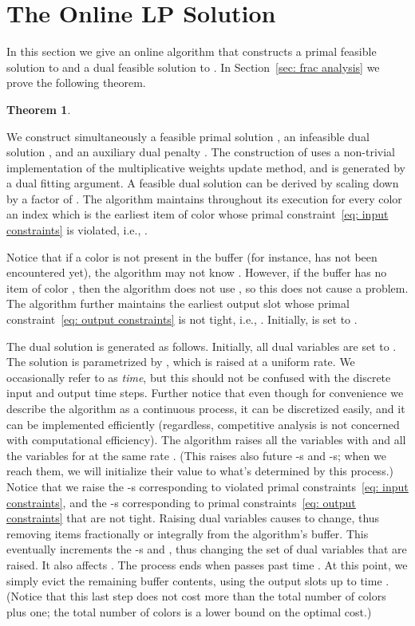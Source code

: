 \documentclass[12pt]{article}
\newtheorem{theorem}{Theorem}[section]
\begin{document}
\section{The Online LP Solution}\label{sec: online lp}

In this section we give an online algorithm that constructs
a primal feasible solution  to  and a dual feasible
solution  to . In Section~\ref{sec: frac analysis}
we prove the following theorem.
\begin{theorem}\label{thm: main}

\end{theorem}

We construct simultaneously a feasible primal solution
, an infeasible dual solution ,
and an auxiliary dual penalty . The construction
of  uses a non-trivial implementation of 
the multiplicative weights update method, and  is
generated by a dual fitting argument.
A feasible dual solution  can be derived by scaling
down  by a factor of .
The algorithm maintains throughout its execution for
every color  an index  which is the earliest item
of color  whose primal constraint~\eqref{eq: input constraints}
is violated, i.e., .

Notice that if a color  is not present in the buffer (for
instance,  has not been encountered yet), the algorithm
may not know . However, if the buffer has no item of
color , then the algorithm does not use , so this
does not cause a problem. The algorithm further maintains
the  earliest output slot  whose primal
constraint~\eqref{eq: output constraints} is not tight, i.e.,
.
Initially,  is set to .

The dual solution  is generated as
follows. Initially, all dual variables are set to . The
solution is parametrized by , which is raised at
a uniform rate. We occasionally refer to  as
{\em time}, but this should not be confused with the
discrete input and output time steps. Further notice
that even though for convenience we describe the
algorithm as a continuous process, it can be discretized
easily, and it can be implemented 
efficiently (regardless, competitive analysis is not concerned
with computational efficiency). 
The algorithm raises all the variables
 with  and all the variables
 for  at the same rate .
(This raises also future -s and -s; when 
we reach them, we will initialize their value to what's determined
by this process.)
Notice that we raise the -s corresponding to
violated primal constraints~\eqref{eq: input constraints},
and the -s corresponding to primal
constraints~\eqref{eq: output constraints} that are not tight.
Raising dual variables causes  to change, thus removing items
fractionally or integrally from the algorithm's buffer. This eventually
increments the -s and , thus changing the set of dual variables that
are raised. It also affects . The process ends when 
passes past time . At this point, we simply evict the remaining
buffer contents, using the output slots up to time .
(Notice that this last step does not cost more than the total
number of colors plus one; the total number of colors is a lower 
bound on the optimal cost.)
\end{document}
